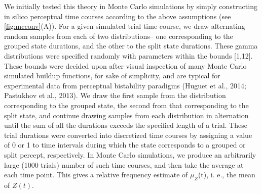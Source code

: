 We initially tested this theory in Monte Carlo simulations by simply constructing in silico perceptual time courses according to the above assumptions (see \ref{fig:mcconv}(A)). For a given simulated trial time course, we draw alternating random samples from each of two distributions– one corresponding to the grouped state durations, and the other to the split state durations. These gamma distributions were specified randomly with parameters within the bounds [1,12]. These bounds were decided upon after visual inspection of many Monte Carlo simulated buildup functions, for sake of simplicity, and are typical for experimental data from perceptual bistability paradigms (Huguet et al., 2014; Pastukhov et al., 2013). We draw the first sample from the distribution corresponding to the grouped state, the second from that corresponding to the split state, and continue drawing samples from each distribution in alternation until the sum of all the durations exceeds the specified length of a trial. These trial durations were converted into discretized time courses by assigning a value of 0 or 1 to time intervals during which the state corresponds to a grouped or split percept, respectively. In Monte Carlo simulations, we produce an arbitrarily large (1000 trials) number of such time courses, and then take the average at each time point. This gives a relative frequency estimate of $\mu_Z$(t), i. e., the mean of $Z(t)$.
